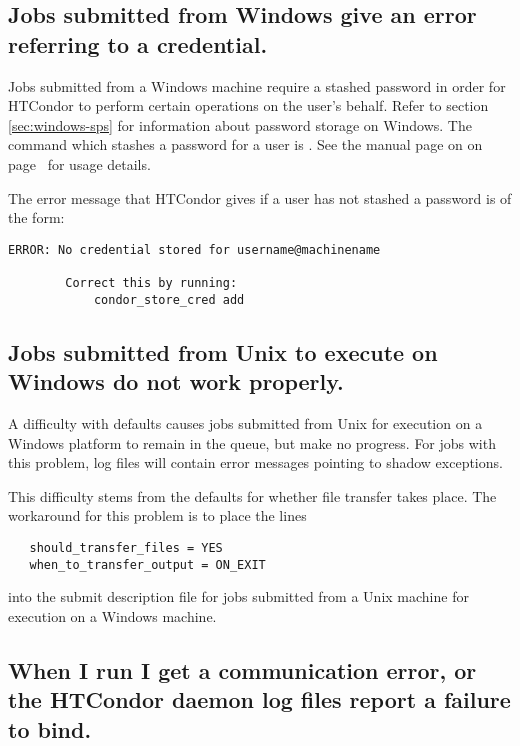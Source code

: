 \subsection*{Jobs submitted from Windows give an error referring to a credential.}

Jobs submitted from a Windows machine require a stashed password in
order for HTCondor to perform certain operations on the user's behalf.
Refer to section \ref{sec:windows-sps} for information about password
storage on Windows.  The command which stashes a password for a user
is .  See the manual page on on
page~\pageref{man-condor-store-cred} for usage details.

The error message that HTCondor gives if a user has not stashed a
password is of the form:
\footnotesize
\begin{verbatim}
ERROR: No credential stored for username@machinename

        Correct this by running:
	        condor_store_cred add
\end{verbatim}
\normalsize

\subsection*{Jobs submitted from Unix to execute on Windows do not work properly.}

A difficulty with defaults causes jobs submitted from Unix for execution
on a Windows platform to remain in the queue, but make no progress.
For jobs with this problem, log files will contain error messages
pointing to shadow exceptions.

This difficulty stems from the defaults for whether file transfer
takes place.
The workaround for this problem is to place the lines
\begin{verbatim}
   should_transfer_files = YES
   when_to_transfer_output = ON_EXIT
\end{verbatim}
into the submit description file for jobs submitted from a Unix
machine for execution on a Windows machine.


\subsection*{When I run  I get a communication error, or the HTCondor daemon log files report a failure to bind.}


